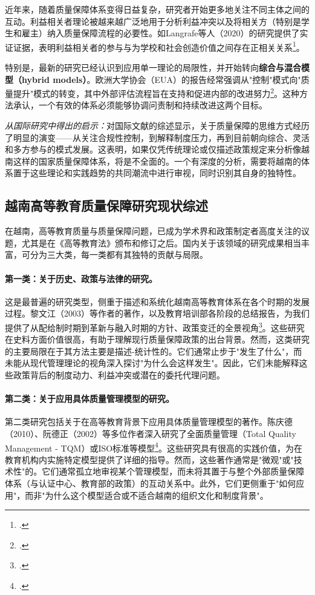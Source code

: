 近年来，随着质量保障体系变得日益复杂，研究者开始更多地关注不同主体之间的互动。利益相关者理论被越来越广泛地用于分析利益冲突以及将相关方（特别是学生和雇主）纳入质量保障流程的必要性。如Langrafe等人（2020）的研究提供了实证证据，表明利益相关者的参与与为学校和社会创造价值之间存在正相关关系\footcite{Langrafe2020}。

特别是，最新的研究已经认识到应用单一理论的局限性，并开始转向\textbf{综合与混合模型（hybrid models）}。欧洲大学协会（EUA）的报告经常强调从"控制"模式向"质量提升"模式的转变，其中外部评估流程旨在支持和促进内部的改进努力\footcite{EUA_Integration}。这种方法承认，一个有效的体系必须能够协调问责制和持续改进这两个目标。

\textit{从国际研究中得出的启示：}对国际文献的综述显示，关于质量保障的思维方式经历了明显的演变——从关注合规性控制，到解释制度压力，再到目前朝向综合、灵活和多方参与的模式发展。这表明，如果仅凭传统理论或仅描述政策规定来分析像越南这样的国家质量保障体系，将是不全面的。一个有深度的分析，需要将越南的体系置于这些理论和实践趋势的共同潮流中进行审视，同时识别其自身的独特性。





\subsection{越南高等教育质量保障研究现状综述}
\label{subsec:tong_quan_vietnam}

在越南，高等教育质量与质量保障问题，已成为学术界和政策制定者高度关注的议题，尤其是在《高等教育法》颁布和修订之后。国内关于该领域的研究成果相当丰富，可分为三大类，每一类都有其独特的贡献与局限。

\paragraph{第一类：关于历史、政策与法律的研究。}
这是最普遍的研究类型，侧重于描述和系统化越南高等教育体系在各个时期的发展过程。黎文江（2003）等作者的著作，以及教育培训部各阶段的总结报告，为我们提供了从配给制时期到革新与融入时期的方针、政策变迁的全景视角\footcite{LeVanGiang2003}。这些研究在史料方面价值很高，有助于理解现行质量保障政策的出台背景。然而，这类研究的主要局限在于其方法主要是描述-统计性的。它们通常止步于"发生了什么"，而未能从现代管理理论的视角深入探讨"为什么会这样发生"。因此，它们未能解释这些政策背后的制度动力、利益冲突或潜在的委托代理问题。

\paragraph{第二类：关于应用具体质量管理模型的研究。}
第二类研究包括关于在高等教育背景下应用具体质量管理模型的著作。陈庆德（2010）、阮德正（2002）等多位作者深入研究了全面质量管理（Total Quality Management - TQM）或ISO标准等模型\footcite{TranKhanhDuc2010}。这些研究具有很高的实践价值，为在教育机构内实施特定模型提供了详细的指导。然而，这些著作通常是"微观"或"技术性"的。它们通常孤立地审视某个管理模型，而未将其置于与整个外部质量保障体系（与认证中心、教育部的政策）的互动关系中。此外，它们更侧重于"如何应用"，而非"为什么这个模型适合或不适合越南的组织文化和制度背景"。

